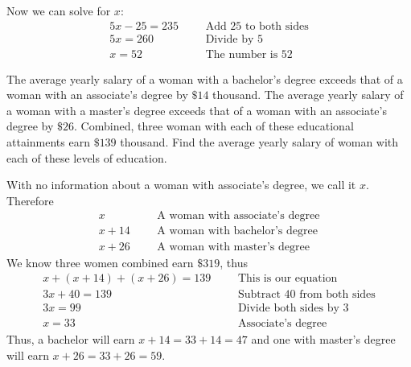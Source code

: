 Now we can solve for $x$:
\begin{align*}
        5x-25 =235& &&\text{Add 25 to both sides}\\
        5x = 260&   &&\text{Divide by 5}\\
        x = 52& &&\text{The number is 52}
\end{align*}
\vspace{0.4cm}
\begin{exa}
     The average yearly salary of a woman with a bachelor's degree exceeds that of a woman with an associate's degree by $\$14$ thousand. The average yearly salary of a woman with a master's degree exceeds that of a woman with an associate's degree by $\$26$. Combined, three woman with each of these educational attainments earn $\$139$ thousand. Find the average yearly salary of woman with each of these levels of education.
\end{exa}
With no information about a woman with associate's degree, we call it $x$. Therefore
\begin{align*}
        x&  &   &\text{A woman with associate's degree}\\
     x+14&  &   &\text{A woman with bachelor's degree}\\
     x+26&  &   &\text{A woman with master's degree}
\end{align*}
We know three women combined earn $\$319$, thus
\begin{align*}
    x+(x+14)+(x+26) = 139&  &   &\text{This is our equation}\\
    3x+40 = 139&    &   &\text{Subtract 40 from both sides}\\
    3x = 99&   &   &\text{Divide both sides by 3}\\
    x = 33& &   &\text{Associate's degree}
\end{align*}
Thus, a bachelor will earn $x+14=33+14=47$ and one with master's degree will earn $x+26=33+26=59$.
